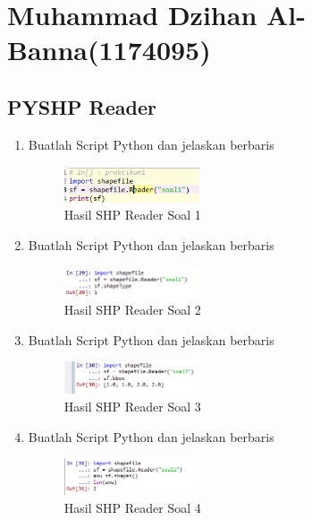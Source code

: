 \section{Muhammad Dzihan Al-Banna(1174095)}
\subsection{PYSHP Reader}
\begin{enumerate}
    \item Buatlah Script Python dan jelaskan berbaris
    
    \hfill\break
    \begin{figure}[H]
		\includegraphics[width=4cm]{figures/1174095/3/1.png}
		\centering
		\caption{Hasil SHP Reader Soal 1}
    \end{figure}
    
    \item Buatlah Script Python dan jelaskan berbaris
    
    \hfill\break
    \begin{figure}[H]
		\includegraphics[width=4cm]{figures/1174095/3/2.png}
		\centering
		\caption{Hasil SHP Reader Soal 2}
    \end{figure}
    
    \item Buatlah Script Python dan jelaskan berbaris
    
    \hfill\break
    \begin{figure}[H]
		\includegraphics[width=4cm]{figures/1174095/3/3.png}
		\centering
		\caption{Hasil SHP Reader Soal 3}
    \end{figure}
    
    \item Buatlah Script Python dan jelaskan berbaris
    
    \hfill\break
    \begin{figure}[H]
		\includegraphics[width=4cm]{figures/1174095/3/4.png}
		\centering
		\caption{Hasil SHP Reader Soal 4}
    \end{figure}
    

\end{enumerate}
